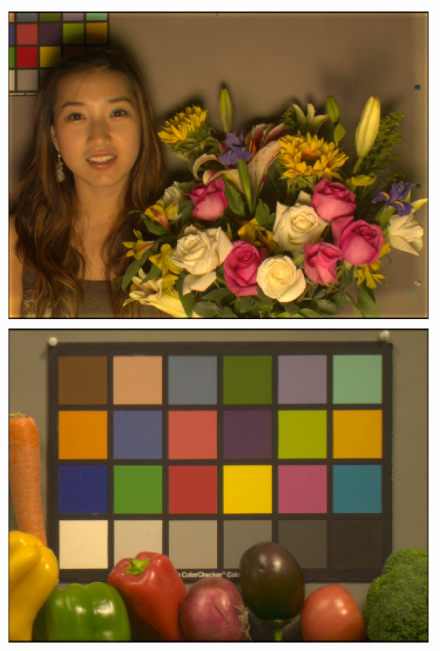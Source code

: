 \documentclass[]{spie}
\begin{document}
\begin{figure}[t]
\begin{center}
\begin{minipage}[b]{0.245\textwidth}
 \includegraphics[width=\textwidth]{Fig4/srgbI_AsianFemaleWithFlowers_RGBW1_Fluorescent1_opt2}
 \includegraphics[width=\textwidth]{Fig4/srgbI_Vegetables_RGBW1_Fluorescent1_opt2}
 \centering\small{}
\end{minipage}
\begin{minipage}[b]{0.245\textwidth}

\end{minipage}
\end{center}
\end{figure}
\end{document}
